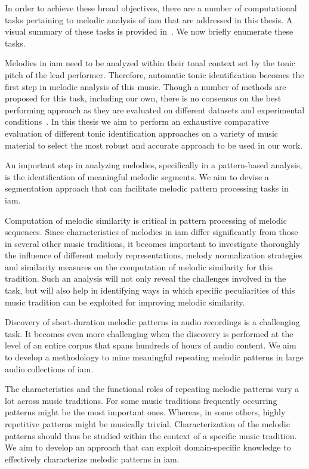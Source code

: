 In order to achieve these broad objectives, there are a number of computational tasks pertaining to melodic analysis of \gls{iam} that are addressed in this thesis. A visual summary of these tasks is provided in~. We now briefly enumerate these tasks.

Melodies in \gls{iam} need to be analyzed within their tonal context set by the tonic pitch of the lead performer. Therefore, automatic tonic identification becomes the first step in melodic analysis of this music. Though a number of methods are proposed for this task, including our own, there is no consensus on the best performing approach as they are evaluated on different datasets and experimental conditions~\citep{Gulati2014Tonic}. In this thesis we aim to perform an exhaustive comparative evaluation of different tonic identification approaches on a variety of music material to select the most robust and accurate approach to be used in our work. 

An important step in analyzing melodies, specifically in a pattern-based analysis, is the identification of meaningful melodic segments. We aim to devise a segmentation approach that can facilitate melodic pattern processing tasks in \gls{iam}. 

Computation of melodic similarity is critical in pattern processing of melodic sequences. Since characteristics of melodies in \gls{iam} differ significantly from those in several other music traditions, it becomes important to investigate thoroughly the influence of different melody representations, melody normalization strategies and similarity measures on the computation of melodic similarity for this tradition. Such an analysis will not only reveal the challenges involved in the task, but will also help in identifying ways in which specific peculiarities of this music tradition can be exploited for improving melodic similarity.  

Discovery of short-duration melodic patterns in audio recordings is a challenging task. It becomes even more challenging when the discovery is performed at the level of an entire corpus that spans hundreds of hours of audio content. We aim to develop a methodology to mine meaningful repeating melodic patterns in large audio collections of \gls{iam}. 

The characteristics and the functional roles of repeating melodic patterns vary a lot across music traditions. For some music traditions frequently occurring patterns might be the most important ones. Whereas, in some others, highly repetitive patterns might be musically trivial. Characterization of the melodic patterns should thus be studied within the context of a specific music tradition. We aim to develop an approach that can exploit domain-specific knowledge to effectively characterize melodic patterns in \gls{iam}.

